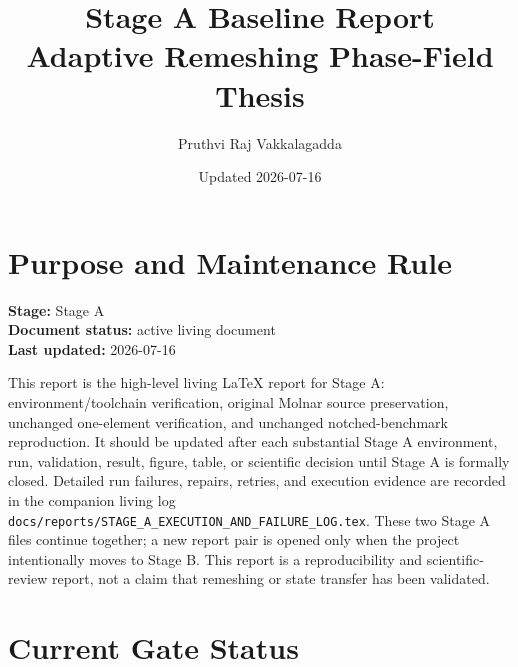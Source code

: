 \documentclass[11pt,a4paper]{article}
\title{Stage A Baseline Report\\Adaptive Remeshing Phase-Field Thesis}
\author{Pruthvi Raj Vakkalagadda}
\date{Updated 2026-07-16}
\begin{document}
\maketitle

\section*{Purpose and Maintenance Rule}

\noindent\textbf{Stage:} Stage A\\
\textbf{Document status:} active living document\\
\textbf{Last updated:} 2026-07-16

\medskip

This report is the high-level living \LaTeX{} report for Stage A: environment/toolchain verification, original Molnar source preservation, unchanged one-element verification, and unchanged notched-benchmark reproduction. It should be updated after each substantial Stage A environment, run, validation, result, figure, table, or scientific decision until Stage A is formally closed. Detailed run failures, repairs, retries, and execution evidence are recorded in the companion living log \texttt{docs/reports/STAGE\_A\_EXECUTION\_AND\_FAILURE\_LOG.tex}. These two Stage A files continue together; a new report pair is opened only when the project intentionally moves to Stage B. This report is a reproducibility and scientific-review report, not a claim that remeshing or state transfer has been validated.

\section*{Current Gate Status}
\end{document}

